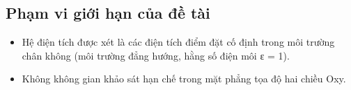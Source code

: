 \subsection{Phạm vi giới hạn của đề tài}
    \begin{itemize}[leftmargin=1.2cm]
    \item Hệ điện tích được xét là các điện tích điểm đặt cố định trong môi trường chân không (môi trường đẳng hướng, hằng số điện môi ε = 1).
    \end{itemize}
    \begin{itemize}[leftmargin=1.2cm]
    \item Không không gian khảo sát hạn chế trong mặt phẳng tọa độ hai chiều Oxy.
    \end{itemize}